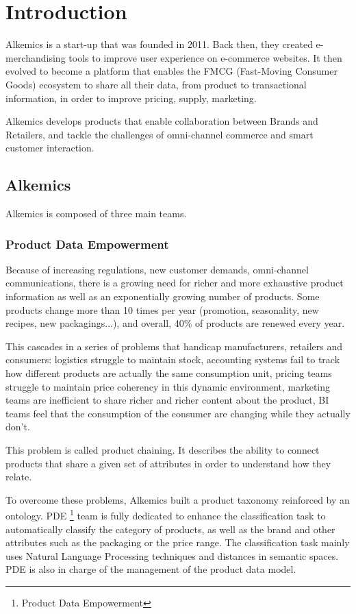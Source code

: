 \chapter{Introduction}

Alkemics is a start-up that was founded in 2011. Back then, they created e-merchandising tools to improve user experience on e-commerce websites. It then evolved to become a platform that enables the FMCG (Fast-Moving Consumer Goods) ecosystem to share all their data, from product to transactional information, in order to improve pricing, supply, marketing.

Alkemics develops products that enable collaboration between Brands and Retailers, and tackle the challenges of omni-channel commerce and smart customer interaction.

\section{Alkemics}

Alkemics is composed of three main teams.

\subsection{Product Data Empowerment}

Because of increasing regulations, new customer demands, omni-channel communications, there is a growing need for richer and more exhaustive product information as well as an exponentially growing number of products. Some products change more than 10 times per year (promotion, seasonality, new recipes, new packagings...), and overall, 40\% of products are renewed every year.

This cascades in a series of problems that handicap manufacturers, retailers and consumers: logistics struggle to maintain stock, accounting systems fail to track how different products are actually the same consumption unit, pricing teams struggle to maintain price coherency in this dynamic environment, marketing teams are inefficient to share richer and richer content about the product, BI teams feel that the consumption of the consumer are changing while they actually don't.

This problem is called product chaining. It describes the ability to connect products that share a given set of attributes in order to understand how they relate.

To overcome these problems, Alkemics built a product taxonomy reinforced by an ontology. PDE \footnote{Product Data Empowerment} team is fully dedicated to enhance the classification task to automatically classify the category of products, as well as the brand and other attributes such as the packaging or the price range. The classification task mainly uses Natural Language Processing techniques and distances in semantic spaces. PDE is also in charge of the management of the product data model.


